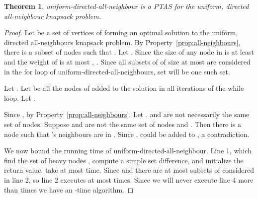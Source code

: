 \documentclass[12pt]{article}
\newtheorem{theorem}{Theorem}
\begin{document}
\begin{center}
\end{center}

\begin{theorem} \label{thm:uniform-directed-all}
{\sc uniform-directed-all-neighbour} is a PTAS for the uniform,
directed all-neighbour knapsack problem.
\end{theorem}

\begin{proof}
Let  be a set of vertices of  forming an optimal solution to
the uniform, directed all-neighbours knapsack problem.  By Property~\ref{prop:all-neighbours},
there is a subset of nodes  such that . Let .  Since the size of
any node in  is at least  and the weight of  is
at most , .  Since all subsets of  of
size at most  are considered in the for loop of {\sc
uniform-directed-all-neighbours}, set  will be one such set.

Let .  Let  be all the nodes of  added to
the solution in all iterations of the while loop.  Let .

Since ,  by
Property~\ref{prop:all-neighbours}.  Let .   and  are not necessarily the same
set of nodes.  Suppose  and  are not the same set of
nodes and .  Then there is a node  such that 's neighbours are in
.  Since ,  could be added to ,
a contradiction.


We now bound the running time of {\sc uniform-directed-all-neighbour}.
Line 1, which find the set of heavy nodes ,
compute a simple set difference, and initialize the return value, take
at most  time.  Since  and  there are at most  subsets of 
considered in line 2, so line 2 executes at most  times.  Since we will never execute line 4 more than
 times we have an -time algorithm.
\end{proof}
\end{document}
